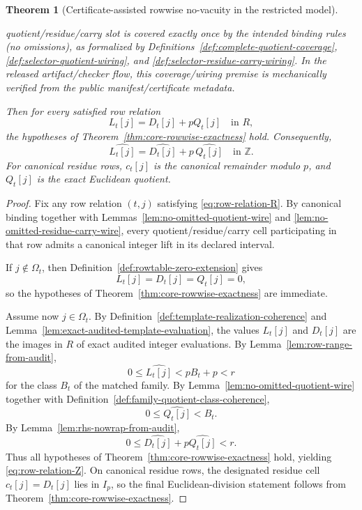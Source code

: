 ﻿\documentclass[11pt]{article}
\newtheorem{theorem}{Theorem}[section]
\newcommand{\Z}{\mathbb{Z}}
\newcommand{\wt}[1]{\widehat{#1}}
\begin{document}
\begin{theorem}[Certificate-assisted rowwise no-vacuity in the restricted model]
\begin{enumerate}[label=(\Alph*),leftmargin=2em]
    quotient/residue/carry slot is covered exactly once by the intended binding
    rules (no omissions), as formalized by
    Definitions~\ref{def:complete-quotient-coverage},
    \ref{def:selector-quotient-wiring}, and
    \ref{def:selector-residue-carry-wiring}. In the released artifact/checker
    flow, this coverage/wiring premise is mechanically verified from the public
    manifest/certificate metadata.
\end{enumerate}
Then for every satisfied row relation
\begin{equation}
L_t[j] = D_t[j] + pQ_t[j]
\quad\text{in }R,
\label{eq:row-relation-R}
\end{equation}
the hypotheses of Theorem~\ref{thm:core-rowwise-exactness} hold. Consequently,
\begin{equation}
\wt{L_t[j]} = \wt{D_t[j]} + p\,\wt{Q_t[j]}
\quad\text{in }\Z.
\label{eq:row-relation-Z}
\end{equation}
For canonical residue rows, \(c_t[j]\) is the canonical remainder modulo \(p\),
and \(Q_t[j]\) is the exact Euclidean quotient.
\end{theorem}

\begin{proof}
Fix any row relation \((t,j)\) satisfying \eqref{eq:row-relation-R}. By
canonical binding together with
Lemmas~\ref{lem:no-omitted-quotient-wire} and
\ref{lem:no-omitted-residue-carry-wire}, every quotient/residue/carry cell
participating in that row admits a canonical integer lift in its declared
interval.

If \(j\notin\Omega_t\), then Definition~\ref{def:rowtable-zero-extension} gives
\[
L_t[j]=D_t[j]=Q_t[j]=0,
\]
so the hypotheses of Theorem~\ref{thm:core-rowwise-exactness} are immediate.

Assume now \(j\in\Omega_t\). By
Definition~\ref{def:template-realization-coherence} and
Lemma~\ref{lem:exact-audited-template-evaluation}, the values \(L_t[j]\) and
\(D_t[j]\) are the images in \(R\) of exact audited integer evaluations. By
Lemma~\ref{lem:row-range-from-audit},
\[
0\le \wt{L_t[j]} < pB_t+p<r
\]
for the class \(B_t\) of the matched family. By
Lemma~\ref{lem:no-omitted-quotient-wire} together with
Definition~\ref{def:family-quotient-class-coherence},
\[
0\le \wt{Q_t[j]}<B_t.
\]
By Lemma~\ref{lem:rhs-nowrap-from-audit},
\[
0\le \wt{D_t[j]}+p\wt{Q_t[j]}<r.
\]
Thus all hypotheses of Theorem~\ref{thm:core-rowwise-exactness} hold, yielding
\eqref{eq:row-relation-Z}. On canonical residue rows, the designated residue
cell \(c_t[j]=D_t[j]\) lies in \(I_p\), so the final Euclidean-division
statement follows from Theorem~\ref{thm:core-rowwise-exactness}.
\end{proof}
\end{document}
